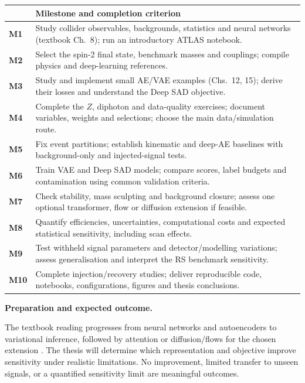 \documentclass[11pt,a4paper]{article}
\newcommand{\lead}[1]{\textbf{#1}\ }
\begin{document}
{\small
\renewcommand{\arraystretch}{1.13}
\begin{tabularx}{\linewidth}{@{}>{\bfseries}p{8mm}X@{}}
\toprule
& \textbf{Milestone and completion criterion}\\
\midrule
M1 & Study collider observables, backgrounds, statistics and neural networks (textbook Ch.~8); run an introductory ATLAS notebook.\\
M2 & Select the spin-2 final state, benchmark masses and couplings; compile physics and deep-learning references.\\
M3 & Study and implement small AE/VAE examples (Chs.~12, 15); derive their losses and understand the Deep SAD objective.\\
M4 & Complete the $Z$, diphoton and data-quality exercises; document variables, weights and selections; choose the main data/simulation route.\\
M5 & Fix event partitions; establish kinematic and deep-AE baselines with background-only and injected-signal tests.\\
M6 & Train VAE and Deep SAD models; compare scores, label budgets and contamination using common validation criteria.\\
M7 & Check stability, mass sculpting and background closure; assess one optional transformer, flow or diffusion extension if feasible.\\
M8 & Quantify efficiencies, uncertainties, computational costs and expected statistical sensitivity, including scan effects.\\
M9 & Test withheld signal parameters and detector/modelling variations; assess generalisation and interpret the RS benchmark sensitivity.\\
M10 & Complete injection/recovery studies; deliver reproducible code, notebooks, configurations, figures and thesis conclusions.\\
\bottomrule
\end{tabularx}
}

\lead{Preparation and expected outcome.}

The textbook reading progresses from neural networks and autoencoders
to variational inference, followed by attention or diffusion/flows for
the chosen extension \cite{book}. The thesis will determine which
representation and objective improve sensitivity under realistic
limitations. No improvement, limited transfer to unseen signals, or a
quantified sensitivity limit are meaningful outcomes.
\end{document}
